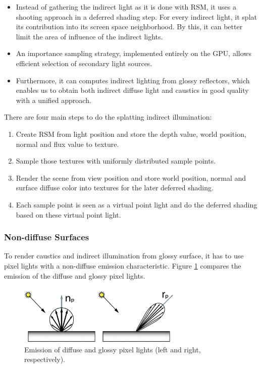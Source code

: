 \begin{itemize}
	\item Instead of gathering the indirect light as it is done with RSM, it uses a shooting approach in a deferred shading step. For every indirect light, it splat its contribution into its screen space neighborhood. By this, it can better limit the area of influence of the indirect lights.
	\item An importance sampling strategy, implemented entirely on the GPU, allows efficient selection of secondary light sources.
	\item Furthermore, it can computes indirect lighting from glossy reflectors, which enables us to obtain both indirect diffuse light and caustics in good quality with a unified approach.
\end{itemize}

There are four main steps to do the splatting indirect illumination:

\begin{enumerate}
	\item Create RSM from light position and store the depth value, world position, normal and flux value to texture.
	\item Sample those textures with uniformly distributed sample points.
	\item Render the scene from view position and store world position, normal and surface diffuse color into textures for the later deferred shading.
	\item Each sample point is seen as a virtual point light and do the deferred shading based on these virtual point light.
\end{enumerate} 




\subsubsection{Non-diffuse Surfaces}
To render caustics and indirect illumination from glossy surface, it has to use pixel lights with a non-diffuse emission characteristic. Figure \ref{f:splatting-indirect-illumination-1} compares the emission of the diffuse and glossy pixel lights.

\begin{figure}\label{f:splatting-indirect-illumination-1}
	\begin{center}
		\includegraphics[width=0.7\textwidth]{graphics/ir/ir-3-2}
	\end{center}
	\caption{Emission of diffuse and glossy pixel lights (left and right, respectively).}
\end{figure}

